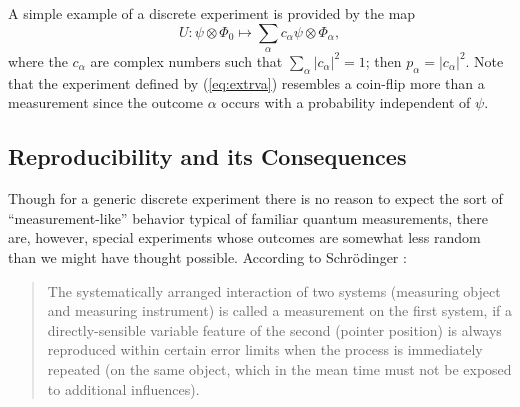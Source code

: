 \documentclass[12pt]{article}
\newcommand{\eq}[1]{(\ref{#1})}
\newcommand{\Sc}{Schr\"{o}dinger}
\renewcommand{\a}{\alpha}
\newcommand{\suma}{\sum_{\a }}
\newcommand{\ot}{\otimes}
\newcommand{\Phia}{\Phi_{\a}}
\begin{document}
A simple example of a discrete experiment is provided by the map
\begin{equation}
U: \psi\ot\Phi_0 \mapsto \suma c_\a
\psi\ot\Phia,
\label{eq:extrva}
\end{equation}
%
where the $c_{\a}$ are complex numbers such that $\suma
|c_{\a}|^{2}=1$; then $ p_{\a}=|c_{\a}|^{2}$.  Note that the
experiment defined by \eq{eq:extrva} resembles a coin-flip more than a
measurement since the outcome $\a$ occurs with a probability
independent of $\psi$.



\subsection{Reproducibility and its Consequences}
\label{sec:RC}
Though for a generic discrete experiment there is no reason to expect
the sort of ``measurement-like'' behavior typical of familiar quantum
measurements, there are, however, special experiments whose outcomes
are somewhat less random than we might have thought possible.
According to \Sc{} \cite{Sch35}:

\begin{quotation}\setlength{\baselineskip}{12pt}\noindent
   The systematically arranged interaction of two systems (measuring
   object and measuring instrument) is called a measurement on the
   first system, if a directly-sensible variable feature of the second
   (pointer position) is always reproduced within certain error limits
   when the process is immediately repeated (on the same object, which
   in the mean time must not be exposed to additional influences).
\end{quotation}
\end{document}
